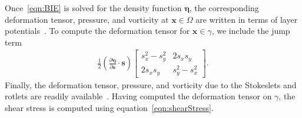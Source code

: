 \documentclass[preprint, superscriptaddress, notitlepage]{revtex4-1}
\newcommand{\eeta}{{\boldsymbol\eta}}
\renewcommand{\ss}{{\mathbf{s}}}
\newcommand{\xx}{{\mathbf{x}}}
\newcommand{\pderiv}[2]{\frac{\partial #1}{\partial #2}}
\begin{document}
Once~\eqref{eqn:BIE} is solved for the density function $\eeta$, the
corresponding deformation tensor, pressure, and vorticity at $\xx \in
\Omega$ are written in terms of layer potentials~\citep{qua-moo2018}.
To compute the deformation tensor for $\xx \in \gamma$, we include the
jump term
\begin{align}
  \frac{1}{2} \left(\pderiv{\eeta}{\ss} \cdot \ss \right) \left[
    \begin{array}{cc}
      s_x^2 - s_y^2 & 2s_x s_y \\ 2s_x s_y & s_y^2 - s_x^2
    \end{array}
  \right].
  \label{eqn:deformationJump}
\end{align}
Finally, the deformation tensor, pressure, and vorticity due to the
Stokeslets and rotlets are readily available~\citep{poz1992}. Having
computed the deformation tensor on $\gamma$, the shear stress is
computed using equation~\eqref{eqn:shearStress}. 

\end{document}
